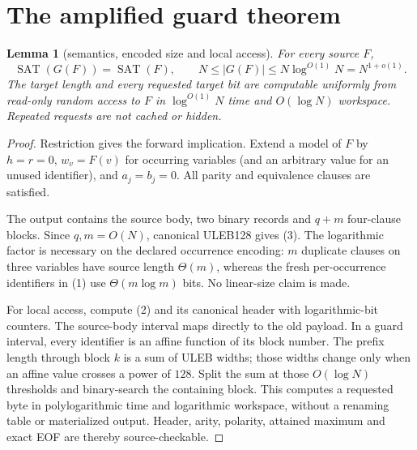 \documentclass[11pt]{article}
\newtheorem{lemma}[theorem]{Lemma}
\newcommand{\SAT}{\operatorname{SAT}}
\begin{document}
\section{The amplified guard theorem}

\begin{lemma}[semantics, encoded size and local access]\label{lem:access}
For every source $F$,
\[
 \SAT(G(F))=\SAT(F),\qquad
 N\le |G(F)|\le N\log^{O(1)}N=N^{1+o(1)}.                \tag{3}
\]
The target length and every requested target bit are computable uniformly
from read-only random access to $F$ in $\log^{O(1)}N$ time and
$O(\log N)$ workspace.  Repeated requests are not cached or hidden.
\end{lemma}
\begin{proof}
Restriction gives the forward implication.  Extend a model of $F$ by
$h=r=0$, $w_v=F(v)$ for occurring variables (and an arbitrary value for an
unused identifier), and $a_j=b_j=0$.  All parity and equivalence clauses are
satisfied.

The output contains the source body, two binary records and $q+m$ four-clause
blocks.  Since $q,m=O(N)$, canonical ULEB128 gives (3).  The logarithmic
factor is necessary on the declared occurrence encoding: $m$ duplicate
clauses on three variables have source length $\Theta(m)$, whereas the fresh
per-occurrence identifiers in (1) use $\Theta(m\log m)$ bits.  No linear-size
claim is made.

For local access, compute (2) and its canonical header with logarithmic-bit
counters.  The source-body interval maps directly to the old payload.  In a
guard interval, every identifier is an affine function of its block number.
The prefix length through block $k$ is a sum of ULEB widths; those widths
change only when an affine value crosses a power of $128$.  Split the sum at
those $O(\log N)$ thresholds and binary-search the containing block.  This
computes a requested byte in polylogarithmic time and logarithmic workspace,
without a renaming table or materialized output.  Header, arity, polarity,
attained maximum and exact EOF are thereby source-checkable.
\end{proof}
\end{document}
